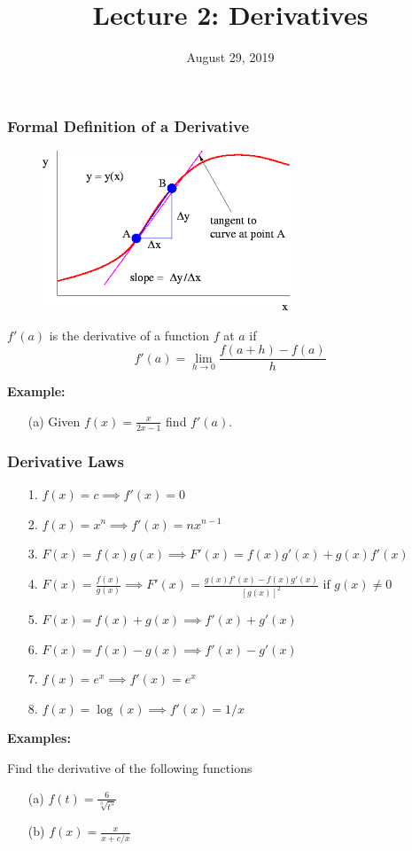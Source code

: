 \documentclass{beamer}
\title{\textbf{Lecture 2: Derivatives}}
\date{August 29, 2019}
\begin{document}
	
\frame{\titlepage}

\begin{frame}
\frametitle{\textbf{Formal Definition of a Derivative}}

\begin{figure}
	\centering
	\includegraphics[height=.4\textheight]{derivative-definition.png}\\
	\hspace*{10pt}\hbox{}
\end{figure}

$f'(a)$ is the derivative of a function $f$ at $a$ if
$$f'(a) = \lim\limits_{h\to 0} \frac{f(a+h)-f(a)}{h}$$

\vspace{6pt}

\textbf{Example:}
\begin{itemize}
	\item[(a)] Given $f(x)=\frac{x}{2x-1}$ find $f'(a)$.
\end{itemize}
\end{frame}


\begin{frame}
\frametitle{\textbf{Derivative Laws}}
\begin{itemize}
	\item[1.] $f(x)=c \implies f'(x) = 0$
	\item[2.] $f(x) = x^n \implies f'(x) = nx^{n-1}$
	\item[3.] $F(x) = f(x)g(x) \implies F'(x)=f(x)g'(x) + g(x)f'(x)$
	\item[4.] $F(x) = \frac{f(x)}{g(x)} \implies F'(x)= \frac{g(x)f'(x)-f(x)g'(x)}{[g(x)]^2} \mbox{ if } g(x) \neq 0$
	\item[5.] $F(x) = f(x) + g(x) \implies f'(x) + g'(x)$
	\item[6.] $F(x)  = f(x) - g(x) \implies f'(x) - g'(x)$
	\item[7.] $f(x) = e^x \implies f'(x) = e^x$
	\item[8.] $f(x) = \log(x) \implies f'(x) = 1/x$
\end{itemize}

\vspace{6pt}

\textbf{Examples:}

Find the derivative of the following functions
\begin{itemize}
	\item[(a)] $f(t)=\frac{6}{\sqrt[3]{t^5}}$
	\item[(b)] $f(x)=\frac{x}{x+c/x}$
\end{itemize}
\end{frame}
\end{document}
